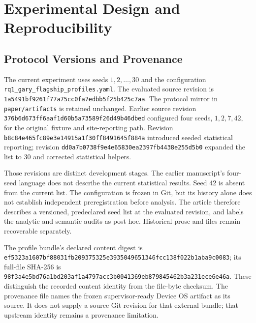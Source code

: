 \section{Experimental Design and Reproducibility}
\label{sec:design}
\subsection{Protocol Versions and Provenance}
The current experiment uses seeds $1,2,\ldots,30$ and the configuration \texttt{rq1\_gary\_flagship\_profiles.yaml}. The evaluated source revision is \texttt{1a5491bf}\allowbreak\texttt{9261f77a}\allowbreak\texttt{75cc0fa7}\allowbreak\texttt{edbb5f25}\allowbreak\texttt{b425c7aa}. The protocol mirror in \texttt{paper/artifacts} is retained unchanged. Earlier source revision \texttt{376b6d67}\allowbreak\texttt{3ff6aaf1}\allowbreak\texttt{d60b5a73}\allowbreak\texttt{589f26d4}\allowbreak\texttt{9b46dbed} configured four seeds, $1,2,7,42$, for the original fixture and site-reporting path. Revision \texttt{b8c84e46}\allowbreak\texttt{5fc89e3e}\allowbreak\texttt{14915a1f}\allowbreak\texttt{30ff8491}\allowbreak\texttt{645f884a} introduced seeded statistical reporting; revision \texttt{dd0a7b07}\allowbreak\texttt{38f9e4e6}\allowbreak\texttt{5830ea23}\allowbreak\texttt{97fb4438}\allowbreak\texttt{e255d5b0} expanded the list to 30 and corrected statistical helpers.

Those revisions are distinct development stages. The earlier manuscript's four-seed language does not describe the current statistical results. Seed 42 is absent from the current list. The configuration is frozen in Git, but its history alone does not establish independent preregistration before analysis. The article therefore describes a versioned, predeclared seed list at the evaluated revision, and labels the analytic and semantic audits as post hoc. Historical prose and files remain recoverable separately.

The profile bundle's declared content digest is \texttt{ef5323a1}\allowbreak\texttt{607bf880}\allowbreak\texttt{31fb2093}\allowbreak\texttt{75325e39}\allowbreak\texttt{35049651}\allowbreak\texttt{346fcc13}\allowbreak\texttt{8f022b1a}\allowbreak\texttt{ba9c0083}; its full-file SHA-256 is \texttt{98f3a4e5}\allowbreak\texttt{bd76a1bd}\allowbreak\texttt{203af1a4}\allowbreak\texttt{797acc3b}\allowbreak\texttt{0041369e}\allowbreak\texttt{b8798454}\allowbreak\texttt{62b3a231}\allowbreak\texttt{ece6e46a}. These distinguish the recorded content identity from the file-byte checksum. The provenance file names the frozen supervisor-ready Device OS artifact as its source. It does not supply a source Git revision for that external bundle; that upstream identity remains a provenance limitation.

